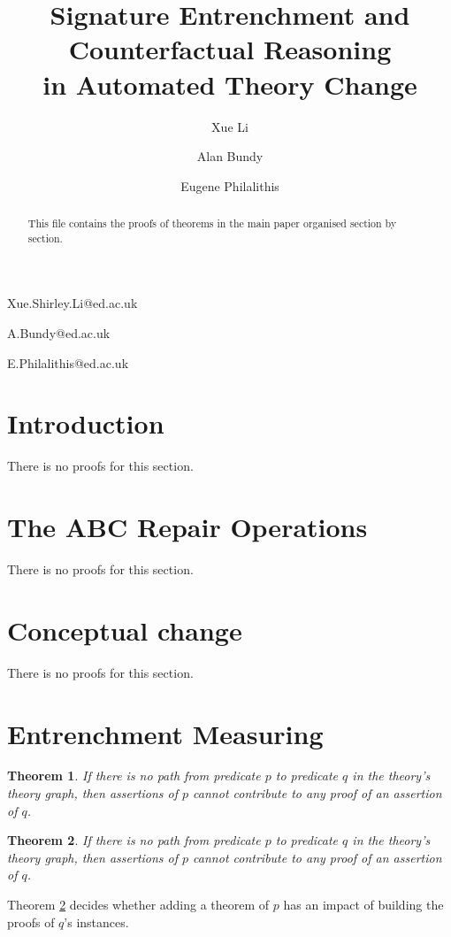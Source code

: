 \documentclass[11pt,letterpaper]{article}
\newtheorem{theorem}{Theorem}[section]
\begin{document}
 

\title{Signature Entrenchment and Counterfactual Reasoning \\
in Automated Theory Change}
 
\author{Xue Li}{Xue.Shirley.Li@ed.ac.uk}
\author{Alan Bundy}{A.Bundy@ed.ac.uk}
\author{Eugene Philalithis}{E.Philalithis@ed.ac.uk}
\address{School of Informatics, University of Edinburgh, UK}
\vskip 0.2in
 
\begin{abstract}
This file contains the proofs of theorems in the main paper organised section by section.   
\end{abstract}

\section{Introduction}
\label{intro}

\noindent 
There is no proofs for this section.
\section{The ABC Repair Operations}
\label{sec:operation}
There is no proofs for this section.

\section{Conceptual change}
\label{sec:conceptualChange}
 There is no proofs for this section.
\section{Entrenchment Measuring}
\label{sec:ee:sig}

\begin{theorem}
\label{therem:ref:theog}
If there is no path from predicate $p$ to predicate $q$ in the theory's theory graph, then assertions of $p$ cannot contribute to any proof of an assertion of $q$.
\end{theorem}
\begin{theorem}
\label{therem:ref:theog}
If there is no path from predicate $p$ to predicate $q$ in the theory's theory graph, then assertions of $p$ cannot contribute to any proof of an assertion of $q$.
\end{theorem}

Theorem \ref{therem:ref:theog} decides whether adding a theorem of $p$ has an impact of building the proofs of $q$’s instances.
\end{document}

